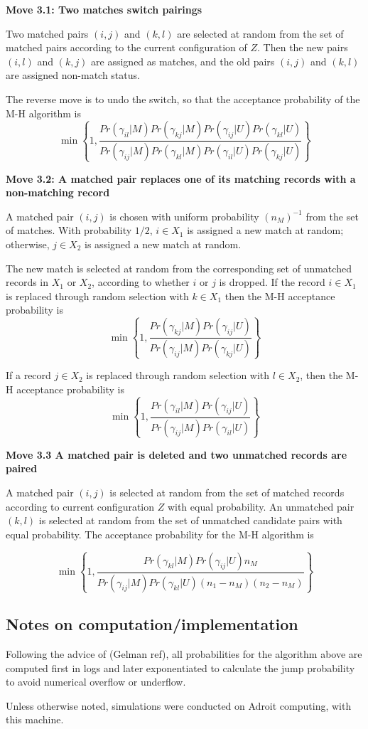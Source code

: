 \documentclass[11pt,reqno]{amsart}
\begin{document}
\textbf{Move 3.1: Two matches switch pairings}

Two matched pairs $(i,j)$ and $(k, l)$ are selected at random from the set of matched pairs according to the current configuration of $Z$.   Then the new pairs $(i,l)$ and $(k,j)$ are assigned as matches, and the old pairs $(i,j)$ and $(k,l)$ are assigned non-match status. 

The reverse move is to undo the switch, so that the acceptance probability of the M-H algorithm is
\[ \min \left\{ 1, \frac{Pr(\gamma_{il} | M) Pr(\gamma_{kj} | M) Pr(\gamma_{ij} | U) Pr(\gamma_{kl} | U)}{Pr(\gamma_{ij} | M) Pr(\gamma_{kl} | M) Pr(\gamma_{il} | U) Pr(\gamma_{kj} | U)} \right\} \] 

\textbf{Move 3.2: A matched pair replaces one of its matching records with a non-matching record}

A matched pair $(i,j)$ is chosen with uniform probability $(n_M)^{-1}$ from the set of matches.  With probability $1/2$, $i\in X_1$ is assigned a new match at random; otherwise, $j\in X_2$ is assigned a new match at random.

The new match is selected at random from the corresponding set of unmatched records in $X_1$ or $X_2$, according to whether $i$ or $j$ is dropped.   If the record $i \in X_1$ is replaced through random selection with $k \in X_1$ then the M-H acceptance probability is
\[ \min \left\{ 1, \frac{Pr(\gamma_{kj} | M) Pr(\gamma_{ij} | U)}{Pr(\gamma_{ij}| M) Pr(\gamma_{kj} | U)} \right\} \]

If a record $j\in X_2$ is replaced through random selection with $l \in X_2$, then the M-H acceptance probability is 
\[ \min \left\{1, \frac{Pr(\gamma_{il} | M) Pr(\gamma_{ij} | U)}{Pr(\gamma_{ij} | M) Pr(\gamma_{il} | U)} \right\} \]

\textbf{Move 3.3 A matched pair is deleted and two unmatched records are paired}

A matched pair $(i,j)$ is selected at random from the set of matched records according to current configuration $Z$ with equal probability.  An unmatched pair $(k,l)$ is selected at random from the set of unmatched candidate pairs with equal probability.   The acceptance probability for the M-H algorithm is

\[ \min \left\{1,  \frac{Pr(\gamma_{kl} | M)Pr(\gamma_{ij} | U) n_M}{Pr(\gamma_{ij} | M) Pr(\gamma_{kl} | U) (n_1 - n_M)(n_2 - n_M)} \right\} \]

\subsection{Notes on computation/implementation}

Following the advice of (Gelman ref), all probabilities for the algorithm above are computed first in logs and later exponentiated to calculate the jump probability to avoid numerical overflow or underflow. 

Unless otherwise noted, simulations were conducted on Adroit computing, with this machine.  
\end{document}
